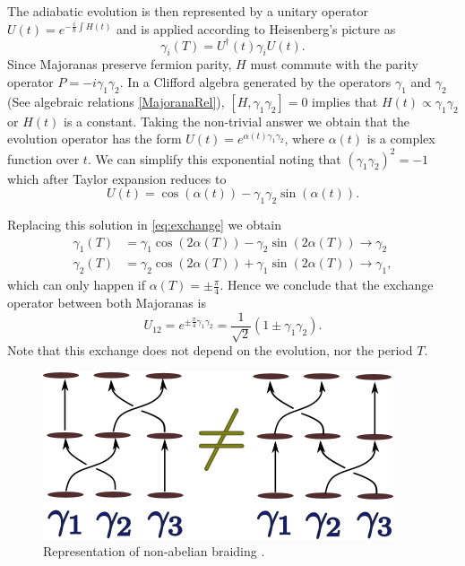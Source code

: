 The adiabatic evolution is then represented by a unitary operator  $ U(t) = e^{-\frac{i}{\hbar}\int H(t)} $ and is applied according to Heisenberg's picture as 
$$\gamma_i(T) = U^\dagger(t)\gamma_iU(t).$$
 \noindent Since Majoranas preserve fermion parity,  $H$ must commute with the parity operator  $P = -i\gamma_{1}\gamma_{2} $. In a Clifford algebra generated by the operators $\gamma_1$ and $\gamma_2$ (See algebraic relations \eqref{MajoranaRel}), $[H,\gamma_{1}\gamma_{2}]=0$ implies that $H(t) \propto \gamma_{1}\gamma_{2}$ or $H(t)$ is a constant. Taking the non-trivial answer we obtain that the  evolution operator has the form $  U(t) = e^{\alpha(t) \gamma_1\gamma_2}$, where $\alpha(t)$ is a complex function over $t$. We can simplify this exponential noting that $\left( \gamma_1\gamma_2 \right)^2 =-1$ which after Taylor expansion reduces to
 \begin{equation}
  U(t) = \cos(\alpha(t))-\gamma_1\gamma_2\sin(\alpha(t)).
 \end{equation}

Replacing this solution in \eqref{eq:exchange} we obtain 
\begin{equation}
\begin{aligned}
\gamma_1(T) &= \gamma_1 \cos(2\alpha(T))- \gamma_2 \sin(2\alpha(T)) \rightarrow  \gamma_2\\
\gamma_2(T) &= \gamma_2 \cos(2\alpha(T))+ \gamma_1 \sin(2\alpha(T)) \rightarrow  \gamma_1,
\end{aligned}
\label{eq:nonab}
\end{equation}
which can only happen if $\alpha(T) = \pm\frac{\pi}{4}$. Hence we conclude that the exchange operator between both Majoranas is 
\begin{equation}
U_{12} = e^{\pm\frac{\pi}{4} \gamma_1\gamma_2}=\frac{1}{\sqrt{2}}\left( 1 \pm \gamma_1 \gamma_2 \right).
\end{equation}
Note that this exchange does not depend on the  evolution, nor  the period $T$. 

\begin{figure}
  \centering
  \includegraphics[scale=1]{IMAGES/Majorana/nonAb.png}
  \caption{\label{fig:Non-ab} Representation of non-abelian braiding .}
\end{figure}

